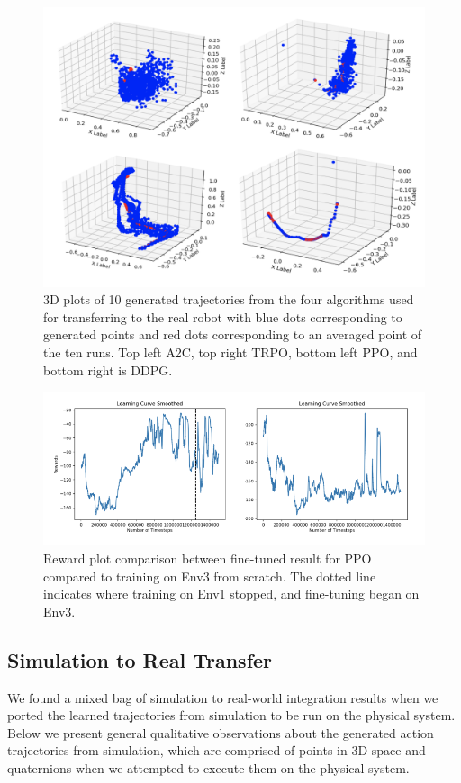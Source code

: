 \documentclass[conference]{IEEEtran}
\begin{document}
\begin{figure}[h!]
\centering
 \includegraphics[scale=0.4]{trajectories.png}
 \caption{3D plots of 10 generated trajectories from the four algorithms used for transferring to the real robot with blue dots corresponding to generated points and red dots corresponding to an averaged point of the ten runs. Top left A2C, top right TRPO, bottom left PPO, and bottom right is DDPG.}
 \label{fig:trajectory}
\end{figure} 

\begin{figure}[h!]
\centering
 \includegraphics[scale=0.6]{fine_tune.png}
 \caption{Reward plot comparison between fine-tuned result for PPO compared to training on Env3 from scratch. The dotted line indicates where training on Env1 stopped, and fine-tuning began on Env3.}
 \label{fig:finetune}
\end{figure} 

\subsection{Simulation to Real Transfer}
We found a mixed bag of simulation to real-world integration results when we ported the learned trajectories from simulation to be run on the physical system. Below we present general qualitative observations about the generated action trajectories from simulation, which are comprised of points in 3D space and quaternions when we attempted to execute them on the physical system.
\end{document}

